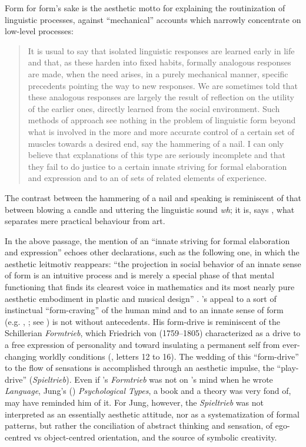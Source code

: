 \documentclass[output=paper]{langscibook}
\begin{document}
Form for form's sake is the aesthetic motto for explaining the routinization of linguistic processes, against ``mechanical'' accounts which narrowly concentrate on low-level processes:

\begin{quotation}
It is usual to say that isolated linguistic responses are learned early in life and that, as these harden into fixed habits, formally analogous responses are made, when the need arises, in a purely mechanical manner, specific precedents pointing the way to new responses. We are sometimes told that these analogous responses are largely the result of reflection on the utility of the earlier ones, directly learned from the social environment. Such methods of approach see nothing in the problem of linguistic form beyond what is involved in the more and more accurate control of a certain set of muscles towards a desired end, say the hammering of a nail. I can only believe that explanations of this type are seriously incomplete and that they fail to do justice to a certain innate striving for formal elaboration and expression and to an  of sets of related elements of experience. \citep[156]{Sapir1924} 
\end{quotation}

The contrast between the hammering of a nail and speaking is reminiscent of that between blowing a candle and uttering the linguistic sound \emph{wh}; it is, says \citet[34]{Sapir1925}, what separates mere practical behaviour from art.

In the above passage, the mention of an ``innate striving for formal elaboration and expression'' echoes other declarations, such as the following one, in which the aesthetic leitmotiv reappears: ``the projection in social behavior of an innate sense of form is an intuitive process and is merely a special phase of that mental functioning that finds its clearest voice in mathematics and its most nearly pure aesthetic embodiment in plastic and musical design'' \citep[344]{Sapir1927a}. {\Sapir}'s appeal to a sort of instinctual ``form-craving'' of the human mind and to an innate sense of form (e.g. \citealt{Sapir1924}, \citealt{Sapir1927a}; see \citealt[445]{Handler1986}) is not without antecedents. His form-drive is reminiscent of the Schillerian \emph{Formtrieb}, which Friedrich von {\Schiller} (1759--1805) characterized as a drive to a free expression of personality and toward insulating a permanent self from ever-changing worldly conditions (\citealt{Schiller1795}, letters 12 to 16). The wedding of this ``form-drive'' to the flow of sensations is accomplished through an aesthetic impulse, the ``play-drive'' (\emph{Spieltrieb}). Even if {\Schiller}'s \emph{Formtrieb} was not on {\Sapir}'s mind when he wrote \emph{Language}, Jung's (\citeyear{Jung1921}) \emph{Psychological Types}, a book and a theory {\Sapir} was very fond of, may have reminded him of it. For Jung, however, the \emph{Spieltrieb} was not interpreted as an essentially aesthetic attitude, nor as a systematization of formal patterns, but rather the conciliation of abstract thinking and sensation, of ego-centred vs object-centred orientation, and the source of symbolic creativity.
\end{document}
